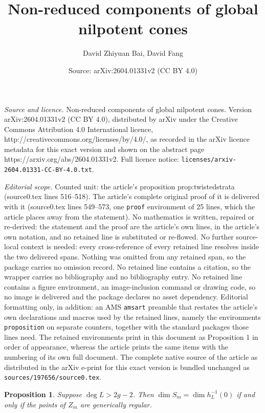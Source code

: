 \documentclass[10pt,a4paper]{amsart}
\title{Non-reduced components of global nilpotent cones}
\author{David Zhiyuan Bai, David Fang}
\date{Source: arXiv:2604.01331v2 (CC BY 4.0)}
\newtheorem{proposition}{Proposition}
\begin{document}
\maketitle

\noindent\emph{Source and licence.} Non-reduced components of global nilpotent cones. Version arXiv:2604.01331v2 (CC BY 4.0), distributed by arXiv under the Creative Commons Attribution 4.0 International licence, http://creativecommons.org/licenses/by/4.0/, as recorded in the arXiv licence metadata for this exact version and shown on the abstract page https://arxiv.org/abs/2604.01331v2. Full licence notice: \texttt{licenses/arxiv-2604.01331-CC-BY-4.0.txt}.\par\smallskip

\noindent\textit{Editorial scope.} Counted unit: the article's proposition prop:twistedstrata (source0.tex lines 516--518). The article's complete original proof of it is delivered with it (source0.tex lines 549--573, one \texttt{proof} environment of 25 lines, which the article places away from the statement). No mathematics is written, repaired or re-derived: the statement and the proof are the article's own lines, in the article's own notation, and no retained line is substituted or re-flowed.  No further source-local context is needed: every cross-reference of every retained line resolves inside the two delivered spans.  Nothing was omitted from any retained span, so the package carries no omission record.  No retained line contains a citation, so the wrapper carries no bibliography and no bibliography entry.  No retained line contains a figure environment, an image-inclusion command or drawing code, so no image is delivered and the package declares no asset dependency.  Editorial formatting only, in addition: an AMS \texttt{amsart} preamble that restates the article's own declarations and macros used by the retained lines, namely the environments \texttt{proposition} on separate counters, together with the standard packages those lines need.  The retained environments print in this document as Proposition 1 in order of appearance, whereas the article prints the same items with the numbering of its own full document.  The complete native source of the article as distributed in the arXiv e-print for this exact version is bundled unchanged as \texttt{sources/197656/source0.tex}.
\begin{proposition}\label{prop:twistedstrata}
    Suppose $\deg L > 2g-2$. Then $\dim S_m = \dim h_L^{-1}(0)$ if and only if the points of $Z_m$ are generically regular. 
\end{proposition}
\end{document}
